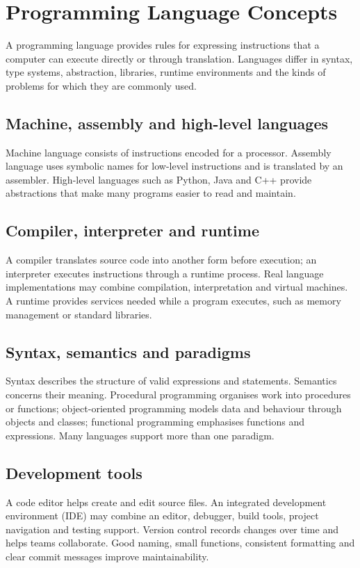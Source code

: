 \documentclass[11pt,openany,oneside]{book}
\begin{document}
\chapter{Programming Language Concepts}
A programming language provides rules for expressing instructions that a computer can execute directly or through translation. Languages differ in syntax, type systems, abstraction, libraries, runtime environments and the kinds of problems for which they are commonly used.

\section{Machine, assembly and high-level languages}
Machine language consists of instructions encoded for a processor. Assembly language uses symbolic names for low-level instructions and is translated by an assembler. High-level languages such as Python, Java and C++ provide abstractions that make many programs easier to read and maintain.

\section{Compiler, interpreter and runtime}
A compiler translates source code into another form before execution; an interpreter executes instructions through a runtime process. Real language implementations may combine compilation, interpretation and virtual machines. A runtime provides services needed while a program executes, such as memory management or standard libraries.

\section{Syntax, semantics and paradigms}
Syntax describes the structure of valid expressions and statements. Semantics concerns their meaning. Procedural programming organises work into procedures or functions; object-oriented programming models data and behaviour through objects and classes; functional programming emphasises functions and expressions. Many languages support more than one paradigm.

\section{Development tools}
A code editor helps create and edit source files. An integrated development environment (IDE) may combine an editor, debugger, build tools, project navigation and testing support. Version control records changes over time and helps teams collaborate. Good naming, small functions, consistent formatting and clear commit messages improve maintainability.
\end{document}

